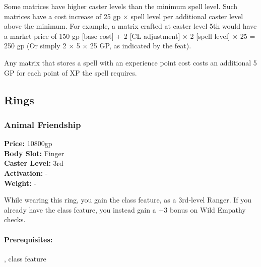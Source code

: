 Some matrices have higher caster levels than the minimum spell level. Such matrices have a cost increase of 25 gp $\times$ spell level per additional caster level above the minimum. For example, a  matrix crafted at caster level 5th would have a market price of 150 gp [base cost] + 2 [CL adjustment] $\times$ 2 [spell level] $\times$ 25 = 250 gp (Or simply 2 $\times$ 5 $\times$ 25 GP, as indicated by the  feat).

Any matrix that stores a spell with an experience point cost costs an additional 5 GP for each point of XP the spell requires.
\subsection{Rings}
\subsubsection{Animal Friendship}
\label{Item:AnimalFriendship}
   \textbf{Price:} 10800gp
\\ \textbf{Body Slot:} Finger
\\ \textbf{Caster Level:} 3rd
\\ \textbf{Activation:} -
\\ \textbf{Weight:} -

While wearing this ring, you gain the  class feature, as a 3rd-level Ranger. If you already have the class feature, you instead gain a +3 bonus on Wild Empathy checks.


\paragraph{Prerequisites:} ,  class feature

